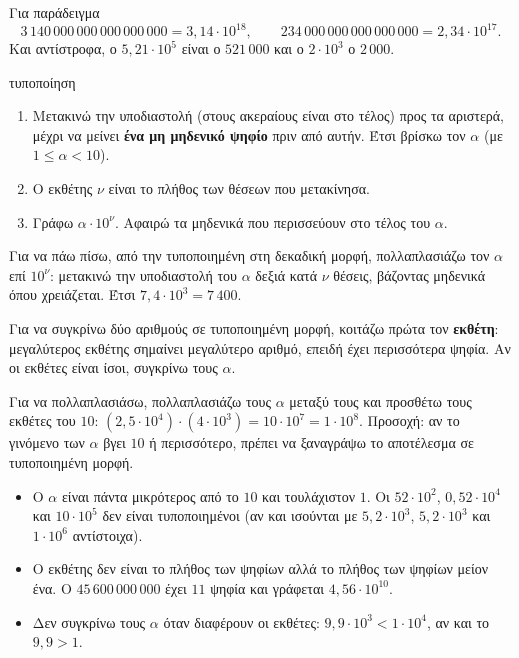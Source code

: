 Για παράδειγμα
$$3\,140\,000\,000\,000\,000\,000=3{,}14\cdot10^{18},\qquad 234\,000\,000\,000\,000\,000=2{,}34\cdot10^{17}.$$
Και αντίστροφα, ο $5{,}21\cdot10^5$ είναι ο $521\,000$ και ο $2\cdot10^3$ ο $2\,000$.


\begin{kanonas}{τυποποίηση}
\begin{enumerate}[leftmargin=1.6em,itemsep=0.3ex,topsep=2pt]
\item Μετακινώ την υποδιαστολή (στους ακεραίους είναι στο τέλος) προς τα αριστερά, μέχρι να μείνει \textbf{ένα μη μηδενικό ψηφίο} πριν από αυτήν. Έτσι βρίσκω τον $\alpha$ (με $1\leq\alpha<10$).
\item Ο εκθέτης $\nu$ είναι το πλήθος των θέσεων που μετακίνησα.
\item Γράφω $\alpha\cdot10^{\nu}$. Αφαιρώ τα μηδενικά που περισσεύουν στο τέλος του $\alpha$.
\end{enumerate}
\end{kanonas}

Για να πάω πίσω, από την τυποποιημένη στη δεκαδική μορφή, πολλαπλασιάζω τον $\alpha$ επί $10^{\nu}$: μετακινώ την υποδιαστολή του $\alpha$ δεξιά κατά $\nu$ θέσεις, βάζοντας μηδενικά όπου χρειάζεται. Έτσι $7{,}4\cdot10^3=7\,400$.


Για να συγκρίνω δύο αριθμούς σε τυποποιημένη μορφή, κοιτάζω πρώτα τον \textbf{εκθέτη}: μεγαλύτερος εκθέτης σημαίνει μεγαλύτερο αριθμό, επειδή έχει περισσότερα ψηφία. Αν οι εκθέτες είναι ίσοι, συγκρίνω τους $\alpha$.

Για να πολλαπλασιάσω, πολλαπλασιάζω τους $\alpha$ μεταξύ τους και προσθέτω τους εκθέτες του $10$: $(2{,}5\cdot10^4)\cdot(4\cdot10^3)=10\cdot10^7=1\cdot10^8$. Προσοχή: αν το γινόμενο των $\alpha$ βγει $10$ ή περισσότερο, πρέπει να ξαναγράψω το αποτέλεσμα σε τυποποιημένη μορφή.

\begin{prosoxi}
\begin{itemize}[leftmargin=1.2em,itemsep=0.3ex,topsep=2pt]
\item Ο $\alpha$ είναι πάντα μικρότερος από το $10$ και τουλάχιστον $1$. Οι $52\cdot10^2$, $0{,}52\cdot10^4$ και $10\cdot10^5$ δεν είναι τυποποιημένοι (αν και ισούνται με $5{,}2\cdot10^3$, $5{,}2\cdot10^3$ και $1\cdot10^6$ αντίστοιχα).
\item Ο εκθέτης δεν είναι το πλήθος των ψηφίων αλλά το πλήθος των ψηφίων μείον ένα. Ο $45\,600\,000\,000$ έχει $11$ ψηφία και γράφεται $4{,}56\cdot10^{10}$.
\item Δεν συγκρίνω τους $\alpha$ όταν διαφέρουν οι εκθέτες: $9{,}9\cdot10^3<1\cdot10^4$, αν και το $9{,}9>1$.
\end{itemize}
\end{prosoxi}

